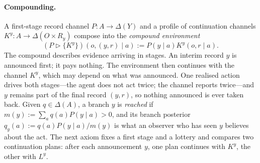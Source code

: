 \documentclass[11pt,a4paper]{article}
\theoremstyle{definition}
\newcommand{\D}{\Delta}
\newcommand{\1}{\mathbf 1}
\begin{document}
\paragraph{Compounding.}
A first-stage record channel $P:A\to\D(Y)$ and a profile of continuation channels
$K^y:A\to\D(O\times R_y)$ compose into the \emph{compound environment}
\begin{equation}
 (P\triangleright\{K^y\})(o,(y,r)\mid a)
 :=P(y\mid a)K^y(o,r\mid a).
 \label{eq:compound}
\end{equation}
The compound describes evidence arriving in stages.  An interim record $y$ is announced first; it pays nothing.
The environment then continues with the channel $K^y$, which may depend on what was announced.  One realised
action drives both stages---the agent does not act twice; the channel reports twice---and $y$ remains part of
the final record $(y,r)$, so nothing announced is ever taken back.
Given $q\in\D(A)$, a branch $y$ is \emph{reached} if $m(y):=\sum_aq(a)P(y\mid a)>0$, and its branch posterior
$q_y(a):=q(a)P(y\mid a)/m(y)$ is what an observer who has seen $y$ believes about the act.  The next axiom fixes
a first stage and a lottery and compares two continuation plans: after each announcement $y$, one plan continues
with $K^y$, the other with $L^y$.
\end{document}
